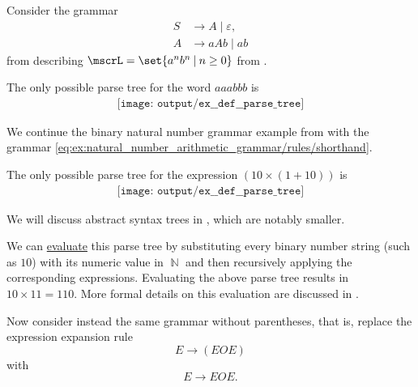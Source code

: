 \begin{example}
\begin{thmenum}
     Consider the grammar
    \begin{equation*}
      \begin{aligned}
        S &\to A \mid \varepsilon, \\
        A &\to aAb \mid ab
      \end{aligned}
    \end{equation*}
    from  describing \( \mscrL = \set{ a^n b^n \given n \geq 0 } \) from .

    The only possible parse tree for the word \( aaabbb \) is
    \begin{equation*}
      \begin{aligned}
        \texttt{[image: output/ex\_\_def\_\_parse\_tree]}
      \end{aligned}
    \end{equation*}

     We continue the binary natural number grammar example from  with the grammar \eqref{eq:ex:natural_number_arithmetic_grammar/rules/shorthand}.

    The only possible parse tree for the expression \( (10 \times (1 + 10)) \) is
    \begin{equation*}
      \begin{aligned}
        \texttt{[image: output/ex\_\_def\_\_parse\_tree]}
      \end{aligned}
    \end{equation*}

    We will discuss abstract syntax trees in , which are notably smaller.

    We can \hyperref[rem:evaluation]{evaluate} this parse tree by substituting every binary number string (such as \( 10 \)) with its numeric value in \( \BbbN \) and then recursively applying the corresponding expressions. Evaluating the above parse tree results in \( 10 \times 11 = 110 \). More formal details on this evaluation are discussed in .

    Now consider instead the same grammar without parentheses, that is, replace the expression expansion rule
    \begin{equation*}
      E \to (E O E)
    \end{equation*}
    with
    \begin{equation*}
      E \to E O E.
    \end{equation*}


\end{thmenum}
\end{example}
